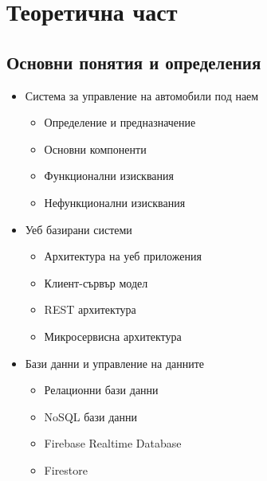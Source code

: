 \documentclass[12pt,a4paper]{article}
\begin{document}
\section{Теоретична част}

\subsection{Основни понятия и определения}
\begin{itemize}
    \item Система за управление на автомобили под наем
    \begin{itemize}
        \item Определение и предназначение
        \item Основни компоненти
        \item Функционални изисквания
        \item Нефункционални изисквания
    \end{itemize}
    
    \item Уеб базирани системи
    \begin{itemize}
        \item Архитектура на уеб приложения
        \item Клиент-сървър модел
        \item REST архитектура
        \item Микросервисна архитектура
    \end{itemize}
    
    \item Бази данни и управление на данните
    \begin{itemize}
        \item Релационни бази данни
        \item NoSQL бази данни
        \item Firebase Realtime Database
        \item Firestore
    \end{itemize}
\end{itemize}
\end{document}
